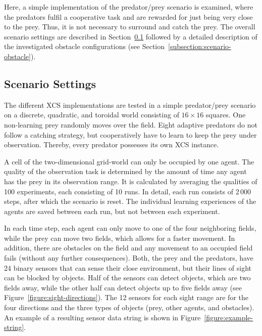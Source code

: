 Here, a simple implementation of the predator/prey scenario is examined, where the predators fulfil a cooperative task and are rewarded for just being very close to the prey. Thus, it is not necessary to surround and catch the prey. The overall scenario settings are described in Section~\ref{subsection:scenario-settings} followed by a detailed description of the investigated obstacle configurations (see Section~\ref{subsection:scenario-obstacle}). %

\subsection{Scenario Settings}
\label{subsection:scenario-settings}

The different XCS implementations are tested in a simple predator/prey scenario on a discrete, quadratic, and toroidal world consisting of $16 \times 16$ squares. One non-learning prey randomly moves over the field. Eight adaptive predators do not follow a catching strategy, but cooperatively have to learn to keep the prey under observation. Thereby, every predator possesses its own XCS instance. 

A cell of the two-dimensional grid-world can only be occupied by one agent. The quality of the observation task is determined by the amount of time any agent has the prey in its observation range. It is calculated by averaging the qualities of 100 experiments, each consisting of 10 runs. In detail, each run consists of 2\,000 steps, after which the scenario is reset. The individual learning experiences of the agents are saved between each run, but not between each experiment.

In each time step, each agent can only move to one of the four neighboring fields, while the prey can move two fields, which allows for a faster movement. In addition, there are obstacles on the field and any movement to an occupied field fails (without any further consequences). Both, the prey and the predators, have 24 binary sensors that can sense their close environment, but their lines of sight can be blocked by objects. Half of the sensors can detect objects, which are two fields away, while the other half can detect objects up to five fields away (see Figure~\ref{figure:sight-directions}). The 12 sensors for each sight range are for the four directions and the three types of objects (prey, other agents, and obstacles). An example of a resulting sensor data string is shown in Figure~\ref{figure:example-string}.



